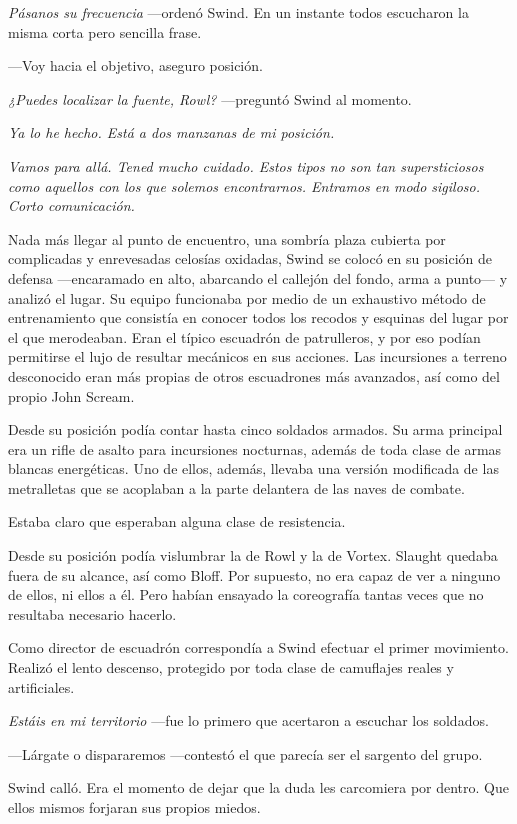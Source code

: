 \emph{Pásanos su frecuencia} ---ordenó Swind. En un instante todos escucharon la misma corta pero sencilla frase.

---Voy hacia el objetivo, aseguro posición.

\emph{¿Puedes localizar la fuente, Rowl?} ---preguntó Swind al momento.

\emph{Ya lo he hecho. Está a dos manzanas de mi posición.}

\emph{Vamos para allá. Tened mucho cuidado. Estos tipos no son tan supersticiosos como aquellos con los que solemos encontrarnos. Entramos en modo sigiloso. Corto comunicación.}

Nada más llegar al punto de encuentro, una sombría plaza cubierta por complicadas y enrevesadas celosías oxidadas, Swind se colocó en su posición de defensa ---encaramado en alto, abarcando el callejón del fondo, arma a punto--- y analizó el lugar. Su equipo funcionaba por medio de un exhaustivo método de entrenamiento que consistía en conocer todos los recodos y esquinas del lugar por el que merodeaban. Eran el típico escuadrón de patrulleros, y por eso podían permitirse el lujo de resultar mecánicos en sus acciones. Las incursiones a terreno desconocido eran más propias de otros escuadrones más avanzados, así como del propio John Scream.

Desde su posición podía contar hasta cinco soldados armados. Su arma principal era un rifle de asalto para incursiones nocturnas, además de toda clase de armas blancas energéticas. Uno de ellos, además, llevaba una versión modificada de las metralletas que se acoplaban a la parte delantera de las naves de combate.

Estaba claro que esperaban alguna clase de resistencia.

Desde su posición podía vislumbrar la de Rowl y la de Vortex. Slaught quedaba fuera de su alcance, así como Bloff. Por supuesto, no era capaz de ver a ninguno de ellos, ni ellos a él. Pero habían ensayado la coreografía tantas veces que no resultaba necesario hacerlo.

Como director de escuadrón correspondía a Swind efectuar el primer movimiento. Realizó el lento descenso, protegido por toda clase de camuflajes reales y artificiales.

\emph{Estáis en mi territorio} ---fue lo primero que acertaron a escuchar los soldados.

---Lárgate o dispararemos ---contestó el que parecía ser el sargento del grupo.

Swind calló. Era el momento de dejar que la duda les carcomiera por dentro. Que ellos mismos forjaran sus propios miedos.

